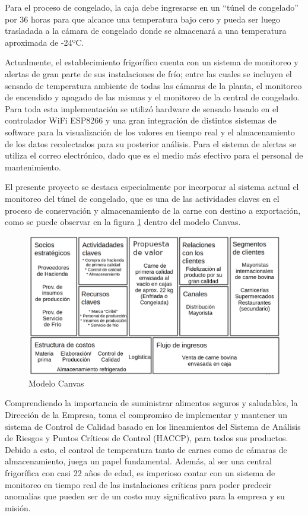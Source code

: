 \documentclass[
11pt, %
]{charter}
\begin{document}
Para el proceso de congelado, la caja debe ingresarse en un “túnel de congelado” por 36 horas para que alcance una temperatura bajo cero y pueda ser luego trasladada a la cámara de congelado donde se almacenará a una temperatura aproximada de -24ºC.

Actualmente, el establecimiento frigorífico cuenta con un sistema de monitoreo y alertas de gran parte de sus instalaciones de frío; entre las cuales se incluyen el sensado de temperatura ambiente de todas las cámaras de la planta, el monitoreo de encendido y apagado de las mismas y el monitoreo de la central de congelado. Para toda esta implementación se utilizó hardware de sensado basado en el controlador WiFi ESP8266 y una gran integración de distintos sistemas de software para la visualización de los valores en tiempo real y el almacenamiento de los datos recolectados para su posterior análisis. Para el sistema de alertas se utiliza el correo electrónico, dado que es el medio más efectivo para el personal de mantenimiento.

El presente proyecto se destaca especialmente por incorporar al sistema actual el monitoreo del túnel de congelado, que es una de las actividades claves en el proceso de conservación y almacenamiento de la carne con destino a exportación, como se puede observar en la figura \ref{fig:canvasdone} dentro del modelo Canvas. 

\begin{figure}[htpb]
\centering 
\includegraphics[width=.75\textwidth]{./Figuras/canvasdone.png}
\caption{Modelo Canvas}
\label{fig:canvasdone}
\end{figure}

Comprendiendo la importancia de suministrar alimentos seguros y saludables, la Dirección de la Empresa, toma el compromiso de implementar y mantener un sistema de Control de Calidad basado en los lineamientos del Sistema de Análisis de Riesgos y Puntos Críticos de Control (HACCP), para todos sus productos. Debido a esto, el control de temperatura tanto de carnes como de cámaras de almacenamiento, juega un papel fundamental. Además, al ser una central frigorífica con casi 22 años de edad, es imperioso contar con un sistema de monitoreo en tiempo real de las instalaciones críticas para poder predecir anomalías que pueden ser de un costo muy significativo para la empresa y su misión.
\end{document}
